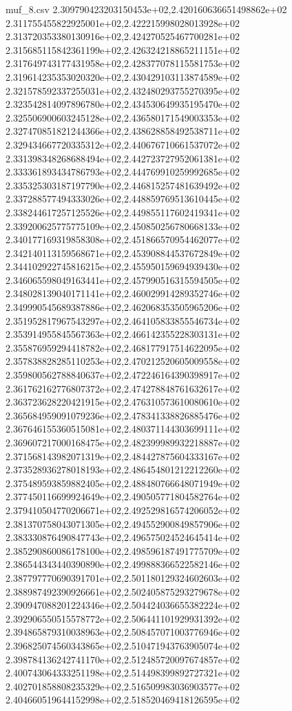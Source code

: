 \begin{filecontents*}{muf_8.csv}
2.309790423203150453e+02,2.420160636651498862e+02
2.311755455822925001e+02,2.422215998028013928e+02
2.313720353380130916e+02,2.424270525467700281e+02
2.315685115842361199e+02,2.426324218865211151e+02
2.317649743177431958e+02,2.428377078115581753e+02
2.319614235353020320e+02,2.430429103113874589e+02
2.321578592337255031e+02,2.432480293755270395e+02
2.323542814097896780e+02,2.434530649935195470e+02
2.325506900603245128e+02,2.436580171549003353e+02
2.327470851821244366e+02,2.438628858492538711e+02
2.329434667720335312e+02,2.440676710661537072e+02
2.331398348268688494e+02,2.442723727952061381e+02
2.333361893434786793e+02,2.444769910259992685e+02
2.335325303187197790e+02,2.446815257481639492e+02
2.337288577494333026e+02,2.448859769513610445e+02
2.338244617257125526e+02,2.449855117602419341e+02
2.339200625775775109e+02,2.450850256780668133e+02
2.340177169319858308e+02,2.451866570954462077e+02
2.342140113159568671e+02,2.453908844537672849e+02
2.344102922745816215e+02,2.455950159694939430e+02
2.346065598049163441e+02,2.457990516315594505e+02
2.348028139040171141e+02,2.460029914289352746e+02
2.349990545689387886e+02,2.462068353505965206e+02
2.351952817967543297e+02,2.464105833855546734e+02
2.353914955845567363e+02,2.466142355228303131e+02
2.355876959294418782e+02,2.468177917514622095e+02
2.357838828285110253e+02,2.470212520605009558e+02
2.359800562788840637e+02,2.472246164390398917e+02
2.361762162776807372e+02,2.474278848761632617e+02
2.363723628220421915e+02,2.476310573610080610e+02
2.365684959091079236e+02,2.478341338826885476e+02
2.367646155360515081e+02,2.480371144303699111e+02
2.369607217000168475e+02,2.482399989932218887e+02
2.371568143982071319e+02,2.484427875604333167e+02
2.373528936278018193e+02,2.486454801212212260e+02
2.375489593859882405e+02,2.488480766648071949e+02
2.377450116699924649e+02,2.490505771804582764e+02
2.379410504770206671e+02,2.492529816574206052e+02
2.381370758043071305e+02,2.494552900849857906e+02
2.383330876490847743e+02,2.496575024524645414e+02
2.385290860086178100e+02,2.498596187491775709e+02
2.386544343440390890e+02,2.499888366522582146e+02
2.387797770690391701e+02,2.501180129324602603e+02
2.388987492390926661e+02,2.502405875293279678e+02
2.390947088201224346e+02,2.504424036655382224e+02
2.392906550515578772e+02,2.506441101929931392e+02
2.394865879310038963e+02,2.508457071003776946e+02
2.396825074560343865e+02,2.510471943763905074e+02
2.398784136242741170e+02,2.512485720097674857e+02
2.400743064333251198e+02,2.514498399892727321e+02
2.402701858808235329e+02,2.516509983036903577e+02
2.404660519644152998e+02,2.518520469418126595e+02

\end{filecontents*}
